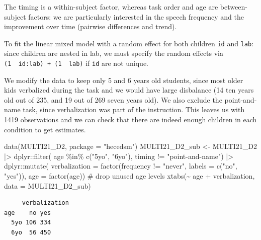 \documentclass[
  11pt,
  letterpaper,
]{scrbook}
\newenvironment{Shaded}{\begin{snugshade}}{\end{snugshade}}
\newcommand{\AttributeTok}[1]{\textcolor[rgb]{0.40,0.45,0.13}{#1}}
\newcommand{\CommentTok}[1]{\textcolor[rgb]{0.37,0.37,0.37}{#1}}
\newcommand{\FunctionTok}[1]{\textcolor[rgb]{0.28,0.35,0.67}{#1}}
\newcommand{\NormalTok}[1]{\textcolor[rgb]{0.00,0.23,0.31}{#1}}
\newcommand{\OtherTok}[1]{\textcolor[rgb]{0.00,0.23,0.31}{#1}}
\newcommand{\SpecialCharTok}[1]{\textcolor[rgb]{0.37,0.37,0.37}{#1}}
\newcommand{\StringTok}[1]{\textcolor[rgb]{0.13,0.47,0.30}{#1}}
\theoremstyle{definition}
\theoremstyle{remark}
\begin{document}
The timing is a within-subject factor, whereas task order and age are
between-subject factors: we are particularly interested in the speech
frequency and the improvement over time (pairwise differences and
trend).

To fit the linear mixed model with a random effect for both children
\texttt{id} and \texttt{lab}: since children are nested in lab, we must
specify the random effects via
\texttt{(1\ \textbar{}\ id:lab)\ +\ (1\ \textbar{}\ lab)} if \texttt{id}
are not unique.

We modify the data to keep only 5 and 6 years old students, since most
older kids verbalized during the task and we would have large disbalance
(14 ten years old out of 235, and 19 out of 269 seven years old). We
also exclude the point-and-name task, since verbalization was part of
the instruction. This leaves us with 1419 observations and we can check
that there are indeed enough children in each condition to get
estimates.

\begin{Shaded}
\begin{Highlighting}[]
\FunctionTok{data}\NormalTok{(MULTI21\_D2, }\AttributeTok{package =} \StringTok{"hecedsm"}\NormalTok{)}
\NormalTok{MULTI21\_D2\_sub }\OtherTok{\textless{}{-}}\NormalTok{ MULTI21\_D2 }\SpecialCharTok{|\textgreater{}}
\NormalTok{  dplyr}\SpecialCharTok{::}\FunctionTok{filter}\NormalTok{(}
\NormalTok{    age }\SpecialCharTok{\%in\%} \FunctionTok{c}\NormalTok{(}\StringTok{"5yo"}\NormalTok{, }\StringTok{"6yo"}\NormalTok{),}
\NormalTok{    timing }\SpecialCharTok{!=} \StringTok{"point{-}and{-}name"}\NormalTok{) }\SpecialCharTok{|\textgreater{}}
\NormalTok{  dplyr}\SpecialCharTok{::}\FunctionTok{mutate}\NormalTok{(}
    \AttributeTok{verbalization =} \FunctionTok{factor}\NormalTok{(frequency }\SpecialCharTok{!=} \StringTok{"never"}\NormalTok{,}
                           \AttributeTok{labels =} \FunctionTok{c}\NormalTok{(}\StringTok{"no"}\NormalTok{, }\StringTok{"yes"}\NormalTok{)),}
    \AttributeTok{age =} \FunctionTok{factor}\NormalTok{(age)) }\CommentTok{\# drop unused age levels}
\FunctionTok{xtabs}\NormalTok{(}\SpecialCharTok{\textasciitilde{}}\NormalTok{ age }\SpecialCharTok{+}\NormalTok{ verbalization, }\AttributeTok{data =}\NormalTok{ MULTI21\_D2\_sub)}
\end{Highlighting}
\end{Shaded}

\begin{verbatim}
     verbalization
age    no yes
  5yo 106 334
  6yo  56 450
\end{verbatim}
\end{document}

